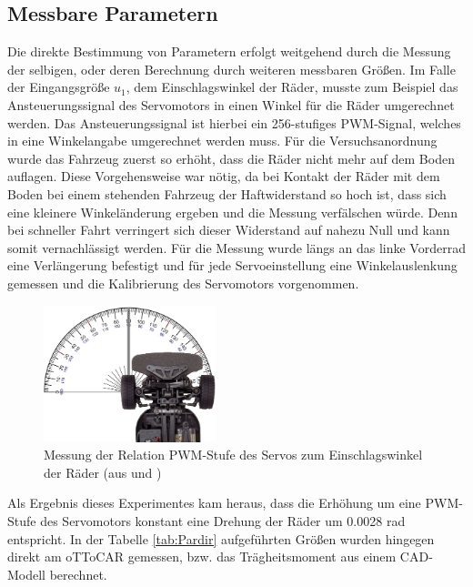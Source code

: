 \subsection{Messbare Parametern}
Die direkte Bestimmung von Parametern erfolgt weitgehend durch die Messung der selbigen, oder deren Berechnung durch weiteren messbaren Größen. Im Falle der Eingangsgröße $u_{1}$, dem Einschlagswinkel der Räder, musste zum Beispiel das Ansteuerungssignal des Servomotors in einen Winkel für die Räder umgerechnet werden. Das Ansteuerungssignal ist hierbei ein 256-stufiges PWM-Signal, welches in eine Winkelangabe umgerechnet werden muss. Für die Versuchsanordnung wurde das Fahrzeug zuerst so erhöht, dass die Räder nicht mehr auf dem Boden auflagen. Diese Vorgehensweise war nötig, da bei Kontakt der Räder mit dem Boden bei einem stehenden Fahrzeug der Haftwiderstand so hoch ist, dass sich eine kleinere Winkeländerung ergeben und die Messung verfälschen würde. Denn bei schneller Fahrt verringert sich dieser Widerstand auf nahezu Null und kann somit vernachlässigt werden. Für die Messung wurde längs an das linke Vorderrad eine Verlängerung befestigt und für jede Servoeinstellung eine Winkelauslenkung gemessen und die Kalibrierung des Servomotors vorgenommen. 
\begin{figure}[H]
	\centering
	\includegraphics[width=5cm]{Bilder/u1Messung.png}
	\caption[Messng der Relation PWM-Stufe Servo zu Einschlagswinkel Räder]
		{Messung der Relation PWM-Stufe des Servos zum Einschlagswinkel der Räder (aus \cite{TT01} und \cite{Wim})}
	\label{pict:u1Mess}
\end{figure}
Als Ergebnis dieses Experimentes kam heraus, dass die Erhöhung um eine PWM-Stufe des Servomotors konstant eine Drehung der Räder um 0.0028 rad entspricht. In der Tabelle \ref{tab:Pardir} aufgeführten Größen wurden hingegen direkt am oTToCAR gemessen, bzw. das Trägheitsmoment aus einem CAD-Modell \cite{TimMar} berechnet. 
